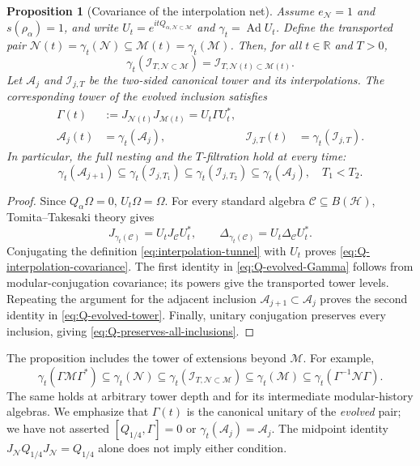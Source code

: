 \documentclass[a4paper,11pt]{article}
\newtheorem{proposition}[theorem]{Proposition}
\theoremstyle{definition}
\newcommand{\mA}{\mathcal{A}}%
\newcommand{\mN}{\mathcal{N}}
\newcommand{\mI}{\mathcal{I}}
\newcommand{\mH}{\mathcal{H}}
\newcommand{\mM}{\mathcal{M}}
\begin{document}
\begin{proposition}[Covariance of the interpolation net]
\label{prop:Q-interpolation-covariance}
Assume $e_{\mN}=1$ and $s(\rho_\alpha)=1$, and write
$U_t=e^{itQ_{\alpha,\mN\subset\mM}}$ and
$\gamma_t=\operatorname{Ad}U_t$. Define the transported pair
$\mN(t)=\gamma_t(\mN)\subseteq\mM(t)=\gamma_t(\mM)$.
Then, for all $t\in\mathbb R$ and $T>0$,
\begin{equation}
 \boxed{\quad
 \gamma_t(\mI_{T,\mN\subset\mM})
 =\mI_{T,\mN(t)\subset\mM(t)}.
 \quad}
 \label{eq:Q-interpolation-covariance}
\end{equation}
Let $\mA_j$ and $\mI_{j,T}$ be the two-sided canonical tower
and its interpolations. The corresponding tower of the evolved
inclusion satisfies
\begin{align}
 \Gamma(t)&:=J_{\mN(t)}J_{\mM(t)}=U_t\Gamma U_t^*,
 \label{eq:Q-evolved-Gamma}\\
 \mA_j(t)&=\gamma_t(\mA_j),&
 \mI_{j,T}(t)&=\gamma_t(\mI_{j,T}).
 \label{eq:Q-evolved-tower}
\end{align}
In particular, the full nesting and the $T$-filtration hold at every
time:
\begin{equation}
 \boxed{\quad
 \gamma_t(\mA_{j+1})\subseteq
 \gamma_t(\mI_{j,T_1})\subseteq
 \gamma_t(\mI_{j,T_2})\subseteq
 \gamma_t(\mA_j),\quad T_1<T_2.
 \quad}
 \label{eq:Q-preserves-all-inclusions}
\end{equation}
\end{proposition}
\begin{proof}
Since $Q_\alpha\Omega=0$, $U_t\Omega=\Omega$. For every
standard algebra $\mathcal C\subseteq B(\mH)$,
Tomita--Takesaki theory gives
\begin{equation}
 J_{\gamma_t(\mathcal C)}=U_tJ_{\mathcal C}U_t^*,
 \qquad
 \Delta_{\gamma_t(\mathcal C)}=U_t\Delta_{\mathcal C}U_t^*.
 \label{eq:Q-Tomita-transport}
\end{equation}
Conjugating the definition \eqref{eq:interpolation-tunnel}
with $U_t$ proves \eqref{eq:Q-interpolation-covariance}.
The first identity in \eqref{eq:Q-evolved-Gamma} follows from
modular-conjugation covariance; its powers give the transported
tower levels. Repeating the argument for the adjacent inclusion
$\mA_{j+1}\subset\mA_j$ proves the second identity in
\eqref{eq:Q-evolved-tower}. Finally, unitary conjugation preserves
every inclusion, giving \eqref{eq:Q-preserves-all-inclusions}.
\end{proof}

The proposition includes the tower of extensions beyond $\mM$.
For example,
\begin{equation}
 \gamma_t(\Gamma\mM\Gamma^*)
 \subseteq\gamma_t(\mN)
 \subseteq\gamma_t(\mI_{T,\mN\subset\mM})
 \subseteq\gamma_t(\mM)
 \subseteq\gamma_t(\Gamma^{-1}\mN\Gamma).
 \label{eq:Q-extension-chain-covariance}
\end{equation}
The same holds at arbitrary tower depth and for its intermediate
modular-history algebras. We emphasize that $\Gamma(t)$ is the
canonical unitary of the \emph{evolved} pair; we have not asserted
$[Q_{1/4},\Gamma]=0$ or
$\gamma_t(\mA_j)=\mA_j$. The midpoint identity
$J_{\mN}Q_{1/4}J_{\mN}=Q_{1/4}$ alone does not imply either condition.
\end{document}
